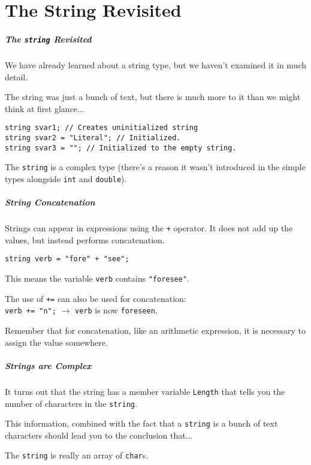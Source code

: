 \part{The String Revisited}
\begin{frame}\partpage\end{frame}

\begin{frame}
\frametitle{The \texttt{string} Revisited}

We have already learned about a string type, but we haven't examined it in much detail.

The string was just a bunch of text, but there is much more to it than we might think at first glance...

\texttt{string svar1; // Creates uninitialized string}\\
\texttt{string svar2 = "Literal"; // Initialized.}\\
\texttt{string svar3 = ""; // Initialized to the empty string.}

The \texttt{string} is a complex type (there's a reason it wasn't introduced in the simple types alongside \texttt{int} and \texttt{double}).

\end{frame}

\begin{frame}
\frametitle{String Concatenation}

Strings can appear in expressions using the \texttt{+} operator. It does not add up the values, but instead performs \alert{concatenation}.

\texttt{string verb = "fore" + "see";}

This means the variable \texttt{verb} contains \texttt{"foresee"}.

The use of \texttt{+=} can also be used for concatenation:\\
\quad \texttt{verb += "n";} $\rightarrow$ \texttt{verb} is now \texttt{foreseen}.

Remember that for concatenation, like an arithmetic expression, it is necessary to assign the value somewhere.

\end{frame}

\begin{frame}
\frametitle{Strings are Complex}

It turns out that the string has a member variable \texttt{Length} that tells you the number of characters in the \texttt{string}.

This information, combined with the fact that a \texttt{string} is a bunch of text characters should lead you to the conclusion that...

The \texttt{string} is really an \alert{array of \texttt{char}s}.

\end{frame}

